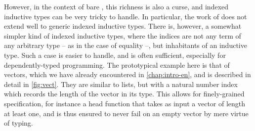 However, in the context of bare , this richness is also
a curse, and indexed inductive types can be very tricky to handle. In particular, the
work of  does not extend well to generic indexed inductive types.
There is, however, a somewhat simpler kind of indexed inductive types, where the indices are
not any term of any arbitrary type – as in the case of equality –,
but inhabitants of an inductive type.
Such a case is easier to handle, and is often sufficient, especially for
dependently-typed programming. The prototypical example here is that of vectors, which
we have already encountered in \cref{chap:intro-en}, and is described in
detail in \cref{fig:vect}. They are similar to
lists, but with a natural number index which records the length of the vector in its type.
This allows for finely-grained specification, for instance a head function that takes as input 
a vector of length at least one, and is thus ensured to never fail on an empty vector
by mere virtue of typing.

\begin{figure*}
  \AP
  \caption{Vector type}
  \label{fig:vect}
  \end{figure*}

